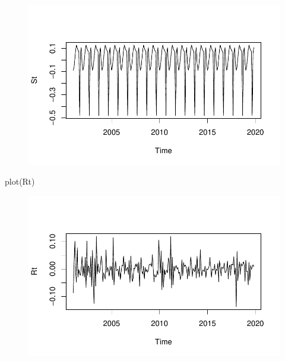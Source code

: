 \documentclass[
  letterpaper,
  DIV=11,
  numbers=noendperiod]{scrartcl}
\newenvironment{Shaded}{\begin{snugshade}}{\end{snugshade}}
\newcommand{\FunctionTok}[1]{\textcolor[rgb]{0.28,0.35,0.67}{#1}}
\newcommand{\NormalTok}[1]{\textcolor[rgb]{0.00,0.23,0.31}{#1}}
\begin{document}
\begin{figure}[H]

{\centering \includegraphics{Quarto_files/figure-pdf/unnamed-chunk-15-2.pdf}

}

\end{figure}

\begin{Shaded}
\begin{Highlighting}[]
\FunctionTok{plot}\NormalTok{(Rt)}
\end{Highlighting}
\end{Shaded}

\begin{figure}[H]

{\centering \includegraphics{Quarto_files/figure-pdf/unnamed-chunk-15-3.pdf}

}

\end{figure}
\end{document}
